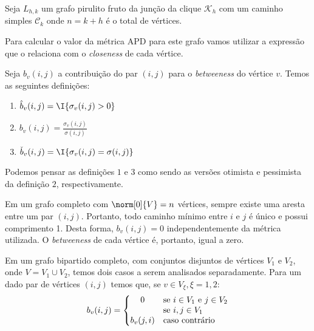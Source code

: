\documentclass[l15, tikzdraw]{homework}
\begin{document}
	\subquest{} %
	Seja $L_{h, k}$ um grafo pirulito fruto da junção da clique $\mathcal{K}_h$ com um caminho simples $\mathcal{C}_{k}$ onde $n = k + h$ é o total de vértices.
	
	\begin{fig}
		\resizebox{.66\textwidth}{!}{
			
		}
	\end{fig}

	Para calcular o valor da métrica APD para este grafo vamos utilizar a expressão que o relaciona com o \textit{closeness} de cada vértice.\par
	
	Seja $b_v(i, j)$ a contribuição do par $(i, j)$ para o \textit{betweeness} do vértice $v$. Temos as seguintes definições:
	\begin{enumerate}
		\item $\displaystyle \hat{b}_v(i, j) = \I{\sigma_v(i, j) > 0}$
		\item $\displaystyle b_v(i, j) = \frac{\sigma_v(i, j)}{\sigma(i, j)}$
		\item $\displaystyle \check{b}_v(i, j) = \I{\sigma_v(i, j) = \sigma(i, j)}$
	\end{enumerate}
	Podemos pensar as definições $1$ e $3$ como sendo as versões otimista e pessimista da definição $2$, respectivamente.

	\subquest{}%
	Em um grafo completo com $\norm[0]{V} = n$ vértices, sempre existe uma aresta entre um par $(i, j)$. Portanto, todo caminho mínimo entre $i$ e $j$ é único e possui comprimento 1. Desta forma, $b_v(i,j) = 0$ independentemente da métrica utilizada. O \textit{betweeness} de cada vértice é, portanto, igual a zero.
	
	\subquest{}%
	Em um grafo bipartido completo, com conjuntos disjuntos de vértices $V_1$ e $V_2$, onde $V = V_1 \cup V_2$, temos dois casos a serem analisados separadamente. Para um dado par de vértices $(i, j)$ temos que, se $v \in V_\xi, \xi = 1, 2$:
	$$b_v(i, j) = \left\{ \begin{array}{@{}cl@{}}
		0& \text{se } i \in V_1 \text{ e } j \in V_2\\
		~& \text{se } i, j \in V_1\\
		b_v(j, i)& \text{caso contrário}
	\end{array} \right.$$

	\subquest{}%
	
\end{document}
